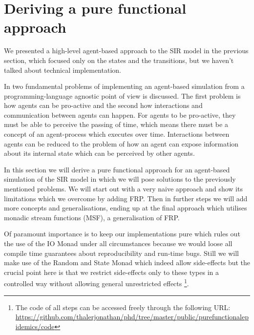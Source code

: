\section{Deriving a pure functional approach}
\label{sec:functional_approach}

We presented a high-level agent-based approach to the SIR model in the previous section, which focused only on the states and the transitions, but we haven't talked about technical implementation. 

In \cite{thaler_art_2017} two fundamental problems of implementing an agent-based simulation from a programming-language agnostic point of view is discussed. The first problem is how agents can be pro-active and the second how interactions and communication between agents can happen. For agents to be pro-active, they must be able to perceive the passing of time, which means there must be a concept of an agent-process which executes over time. Interactions between agents can be reduced to the problem of how an agent can expose information about its internal state which can be perceived by other agents.

In this section we will derive a pure functional approach for an agent-based simulation of the SIR model in which we will pose solutions to the previously mentioned problems. We will start out with a very naive approach and show its limitations which we overcome by adding FRP. Then in further steps we will add more concepts and generalisations, ending up at the final approach which utilises monadic stream functions (MSF), a generalisation of FRP. 

Of paramount importance is to keep our implementations pure which rules out the use of the IO Monad under all circumstances because we would loose all compile time guarantees about reproducibility and run-time bugs. Still we will make use of the Random and State Monad which indeed allow side-effects but the crucial point here is that we restrict side-effects only to these types in a controlled way without allowing general unrestricted effects
\footnote{The code of all steps can be accessed freely through the following URL: \url{https://github.com/thalerjonathan/phd/tree/master/public/purefunctionalepidemics/code}}.







